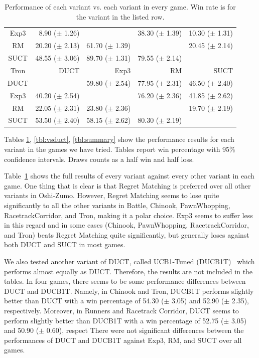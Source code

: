\documentclass[conference]{IEEEtran}
\begin{document}
\begin{table}
\begin{center}
\begin{tabular}{|c|rrrr|}
           Exp3    & 8.90 ($\pm$ 1.26)   &          & 38.30 ($\pm$ 1.39)   & 10.30 ($\pm$ 1.31)   \\
             RM    & 20.20 ($\pm$ 2.13)   & 61.70 ($\pm$ 1.39)   &          & 20.45 ($\pm$ 2.14)   \\
           SUCT    & 48.55 ($\pm$ 3.06)   & 89.70 ($\pm$ 1.31)   & 79.55 ($\pm$ 2.14)   &          \\
\hline
\hline
           Tron   &       DUCT   &       Exp3   &         RM   &       SUCT   \\
\hline
           DUCT    &          & 59.80 ($\pm$ 2.54)   & 77.95 ($\pm$ 2.31)   & 46.50 ($\pm$ 2.40)   \\
           Exp3    & 40.20 ($\pm$ 2.54)   &          & 76.20 ($\pm$ 2.36)   & 41.85 ($\pm$ 2.62)   \\
             RM    & 22.05 ($\pm$ 2.31)   & 23.80 ($\pm$ 2.36)   &          & 19.70 ($\pm$ 2.19)   \\
           SUCT    & 53.50 ($\pm$ 2.40)   & 58.15 ($\pm$ 2.62)   & 80.30 ($\pm$ 2.19)   &          \\
\hline
\end{tabular}
\end{center}
\caption{Performance of each variant vs. each variant in every game. Win rate is for the variant in the listed row. \label{tbl:cross}}
\end{table}



Tables \ref{tbl:cross}, \ref{tbl:vsduct}, \ref{tbl:summary} show the performance results for each variant in the games we have tried. 
Tables report win percentage with 95\% confidence intervals. Draws counts as a half win and half loss. 

Table~\ref{tbl:cross} shows the full results of every variant against every other variant in each game. One thing that is clear is that 
Regret Matching is preferred over all other variants in Oshi-Zumo. However, Regret Matching seems to lose quite significantly to all the 
other variants in Battle, Chinook, PawnWhopping, RacetrackCorridor, and Tron, making it a polar choice. Exp3 seems to suffer less in this
regard and in some cases (Chinook, PawnWhopping, RacetrackCorridor, and Tron) beats Regret Matching quite significantly, but generally loses
against both DUCT and SUCT in most games. 


We also tested another variant of DUCT, called UCB1-Tuned (DUCB1T)~\cite{Auer02Finite} which performs almost equally as DUCT. Therefore, the results are not included in the tables. In four games, there seems to be some performance differences between DUCT and DUCB1T. Namely, in Chinook and Tron, DUCB1T performs slightly better than DUCT with a win percentage of 54.30 ($\pm$ 3.05) and 52.90 ($\pm$ 2.35), respectively. Moreover, in Runners and Racetrack Corridor, DUCT seems to perform slightly better than DUCB1T with a win percentage of 52.75 ($\pm$ 3.05) and 50.90 ($\pm$ 0.60), respect
There were not significant differences between the performances of DUCT and DUCB1T against Exp3, RM, and SUCT over all games.
\end{document}
